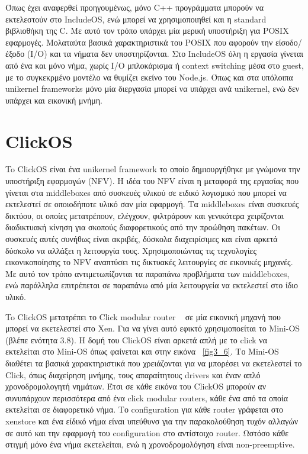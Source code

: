 Όπως έχει αναφερθεί προηγουμένως, μόνο C++ προγράμματα μπορούν να εκτελεστούν
στο IncludeOS, ενώ μπορεί να χρησιμοποιηθεί και η standard βιβλιοθήκη της C. Με
αυτό τον τρόπο υπάρχει μία μερική υποστήριξη για POSIX εφαρμογές. Μολαταύτα
βασικά χαρακτηριστικά του POSIX που αφορούν την είσοδο/έξοδο (Ι/Ο) και τα νήματα
δεν υποστηρίζονται.
Στο IncludeOS όλη η εργασία γίνεται από ένα και μόνο νήμα, χωρίς I/O μπλοκάρισμα
ή context switching μέσα στο guest, με το συγκεκρμένο μοντέλο να θυμίζει εκείνο
του Node.js. Όπως και στα υπόλοιπα unikernel frameworks μόνο μία διεργασία
μπορεί να υπάρχει ανά unikernel, ενώ δεν υπάρχει και εικονική μνήμη.


\section{ClickOS}
To ClickOS είναι ένα unikernel framework το οποίο δημιουργήθηκε με γνώμονα την
υποστήριξη εφαρμογών  (NFV). H ιδέα του NFV είναι
η μεταφορά της εργασίας που γίνεται στα middleboxes από συσκευές υλικού σε
ειδικό λογισμικό που μπορεί να εκτελεστεί σε οποιοδήποτε υλικό σαν μία εφαρμογή.
Τα middleboxes είναι συσκευές δικτύου, οι οποίες μετατρέπουν, ελέγχουν,
φιλτράρουν και γενικότερα χειρίζονται διαδικτυακή κίνηση για σκοπούς
διαφορετικούς από την προώθηση πακέτων. Οι συσκευές αυτές συνήθως είναι ακριβές,
δύσκολα διαχειρίσιμες και είναι αρκετά δύσκολο να αλλάξει η λειτουργία τους.
Χρησιμοποιώντας τις τεχνολογίες εικονικοποίησης το NFV αναπτύσει τις δικτυακές
λειτουργίες σε εικονικές μηχανές. Με αυτό τον τρόπο αντιμετωπίζονται τα παραπάνω
προβλήματα των middleboxes, ενώ παράλληλα επιτρέπεται σε παραπάνω από μία
λειτουργεία να εκτελεστεί στο ίδιο υλικό.

To ClickOS μετατρέπει το Click modular router ~\cite{kohler2000click} σε μία
εικονική μηχανή που μπορεί να εκετελεστεί στο Xen. Για να γίνει αυτό εφικτό
χρησιμοποείται το Mini-OS (βλέπε ενότητα 3.8). H δομή του ClickOS είναι αρκετά
απλή με το click να εκτελείται στο Mini-OS όπως φαίνεται και στην εικόνα
~\ref{fig3_6}. Το Mini-OS διαθέτει τα βασικά χαρακτηριστικά που χρειάζονται για
να μπορέσει να εκετελεστεί το Click, όπως διαχείρηση μνήμης, τους απαραίτητους
drivers και έναν απλό χρονοδρομολογητή νημάτων. Έτσι σε κάθε εικόνα του ClickOS
μπορούν αν συνυπάρχουν περισσότερα από ένα click modular routers, κάθε ένα από
τα οποία εκτελείται σε διαφορετικό νήμα. Το configuration για κάθε router
γράφεται στο xenstore και ένα είδικό νήμα είναι υπεύθυνσ για την παρακολούθηση
τυχόν αλλαγών σε αυτό και την εφαρμογή του configuration στο αντίστοιχο router.
Ωστόσο κάθε στιγμή μόνο ένα νήμα εκετελείται, ενώ η χρονοδρομολόγηση είναι
non-preemptive. 

